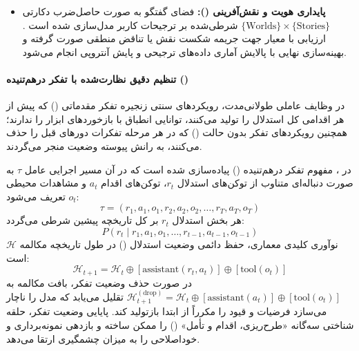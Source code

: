 \begin{itemize}
    \item \textbf{پایداری هویت و نقش‌آفرینی ():} فضای گفتگو به صورت حاصل‌ضرب دکارتی $\{\text{Worlds}\} \times \{\text{Stories}\}$ شرطی‌شده بر ترجیحات کاربر مدل‌سازی شده است \cite{minimax2026her}. ارزیابی با معیار  جهت جریمه شکست نقش یا تناقض منطقی صورت گرفته و بهینه‌سازی نهایی با پالایش آماری داده‌های ترجیحی و پایش آنتروپی انجام می‌شود.
\end{itemize}

\paragraph*{تنظیم دقیق نظارت‌شده با تفکر درهم‌تنیده ()}
در وظایف عاملی طولانی‌مدت، رویکردهای سنتی زنجیره تفکر مقدماتی () که پیش از هر اقدامی کل استدلال را تولید می‌کنند، توانایی انطباق با بازخوردهای ابزار را ندارند؛ همچنین رویکردهای تفکر بدون حالت () که در هر مرحله تفکرات دورهای قبل را حذف می‌کنند، به رانش پیوسته وضعیت منجر می‌گردند. 

در ، مفهوم تفکر درهم‌تنیده () پیاده‌سازی شده است که در آن مسیر اجرایی عامل $\tau$ به صورت دنباله‌ای متناوب از توکن‌های استدلال $r_t$، توکن‌های اقدام $a_t$ و مشاهدات محیطی $o_t$ تعریف می‌شود:
\begin{equation}
    \tau = (r_1, a_1, o_1, r_2, a_2, o_2, \dots, r_T, a_T, o_T)
\end{equation}
هر بخش استدلال $r_t$ بر کل تاریخچه پیشین شرطی می‌گردد:
\begin{equation}
    P(r_t \mid r_1, a_1, o_1, \dots, r_{t-1}, a_{t-1}, o_{t-1})
\end{equation}
نوآوری کلیدی معماری، حفظ دائمی وضعیت استدلال () در طول تاریخچه مکالمه $\mathcal{H}$ است:
\begin{equation}
    \mathcal{H}_{t+1} = \mathcal{H}_t \oplus [\text{assistant}(r_t, a_t)] \oplus [\text{tool}(o_t)]
\end{equation}
در صورت حذف وضعیت تفکر، بافت مکالمه به $\mathcal{H}_{t+1}^{(\text{drop})} = \mathcal{H}_t \oplus [\text{assistant}(a_t)] \oplus [\text{tool}(o_t)]$ تقلیل می‌یابد که مدل را ناچار می‌سازد فرضیات و قیود را مکرراً از ابتدا بازتولید کند. پایایی وضعیت تفکر، حلقه شناختی سه‌گانه «طرح‌ریزی، اقدام و تأمل» () را ممکن ساخته و بازدهی نمونه‌برداری و خوداصلاحی را به میزان چشمگیری ارتقا می‌دهد.

